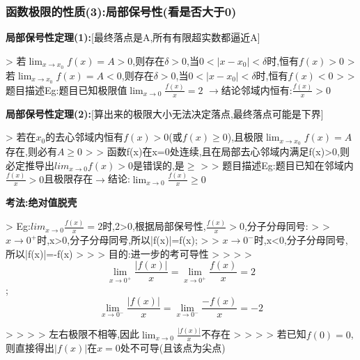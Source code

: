 \documentclass[11pt,a4paper,UTF8]{ctexart}
\begin{document}
\subsubsection{函数极限的性质(3):局部保号性(看是否大于0)}

    \textbf{局部保号性定理(1):}[最终落点是A,所有有限超实数都逼近A]

\begin{solbox}[{分步推导与答题规范}]
    >   \textit{}若$\lim_{x \to x_0} f(x) = A > 0$,则存在$\delta > 0$,当$0 < \vert{}x - x_0\vert{} < \delta$时,恒有$f(x) > 0$
    >   若$\lim_{x \to x_0} f(x) = A < 0$,则存在$\delta > 0$,当$0 < \vert{}x - x_0\vert{} < \delta$时,恒有$f(x) < 0$\textit{}
    >
    >   题目描述Eg:题目已知极限值$\lim_{x \to 0} \frac{f(x)}{x} = 2$ $\rightarrow$结论邻域内恒有:$\frac{f(x)}{x} > 0$
\end{solbox}

    \textbf{局部保号性定理(2):}[算出来的极限大小无法决定落点,最终落点可能是下界]

\begin{solbox}[{分步推导与答题规范}]
    >   \textit{}若在$x_0$的去心邻域内恒有$f(x) > 0$(或$f(x) \ge 0$),且极限$\lim_{x \to x_0} f(x) = A$存在,则必有$A \ge 0$\textit{}
    >
    >   函数f(x)在x=0处连续,且在局部去心邻域内满足f(x)>0,则必定推导出$lim_{x\rightarrow 0}f(x)>0$是错误的,是$\geq$
    >
    >   题目描述Eg:题目已知在邻域内$\frac{f(x)}{x} > 0$且极限存在$\rightarrow$结论:$\lim_{x \to 0} \frac{f(x)}{x} \ge 0$
\end{solbox}

    \textbf{考法:绝对值脱壳}

\begin{solbox}[{分步推导与答题规范}]
    >   Eg:$lim_{x\rightarrow 0}\frac{f(x)}{x}=2$时,2>0,根据局部保号性,$\frac{f(x)}{x}>0$,分子分母同号:
    >
    >   $x\rightarrow 0^+$时,x>0,分子分母同号,所以|f(x)|=f(x);
    >
    >   $x\rightarrow 0^-$时,x<0,分子分母同号,所以|f(x)|=-f(x)
    >
    >   >   目的:进一步的考可导性
    >   >
    >   >   
\begin{equation*}
\lim_{x \to 0^+} \frac{\vert{}f(x)\vert{}}{x} = \lim_{x \to 0^+} \frac{f(x)}{x} = 2
\end{equation*}
;
\begin{equation*}
\lim_{x \to 0^-} \frac{\vert{}f(x)\vert{}}{x} = \lim_{x \to 0^-} \frac{-f(x)}{x} = -2
\end{equation*}

    >   >
    >   >   左右极限不相等,因此$\lim_{x \to 0} \frac{\vert{}f(x)\vert{}}{x}$不存在
    >   >
    >   >   若已知$f(0)=0$,则直接得出$\vert{}f(x)\vert{}$在$x=0$处不可导(且该点为尖点)
\end{solbox}
\end{document}
